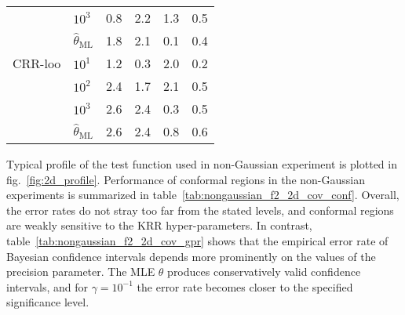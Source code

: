 \documentclass[10pt, conference, compsocconf]{IEEEtran}
\begin{document}
\begin{table}
\begin{tabular}{ll||rrrr}
       & $10^3$ &      0.8 &      2.2 &      1.3 &      0.5 \\
       & $\hat{\theta}_\text{ML}$ &      1.8 &      2.1 &      0.1 &      0.4 \\
  \midrule
  CRR-loo & $10^1$ &      1.2 &      0.3 &      2.0 &      0.2 \\
       & $10^2$ &      2.4 &      1.7 &      2.1 &      0.5 \\
       & $10^3$ &      2.6 &      2.4 &      0.3 &      0.5 \\
       & $\hat{\theta}_\text{ML}$ &      2.6 &      2.4 &      0.8 &      0.6 \\
  \bottomrule
  \end{tabular}
\end{table}

Typical profile of the test function used in non-Gaussian experiment is plotted
in fig.~\ref{fig:2d_profile}. Performance of conformal regions in the non-Gaussian
experiments is summarized in table~\ref{tab:nongaussian_f2_2d_cov_conf}. Overall,
the error rates do not stray too far from the stated levels, and conformal regions
are weakly sensitive to the KRR hyper-parameters. In contrast, table~\ref{tab:nongaussian_f2_2d_cov_gpr}
shows that the empirical error rate of Bayesian confidence intervals depends more
prominently on the values of the precision parameter. The MLE $\theta$ produces
conservatively valid confidence intervals, and for $\gamma=10^{-1}$ the error rate
becomes closer to the specified significance level.
\end{document}
